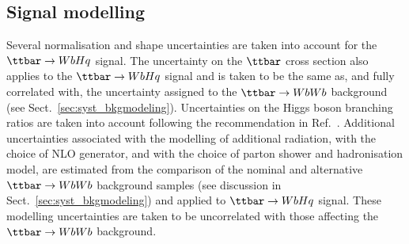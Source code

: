 \subsection{Signal modelling}
\label{sec:syst_sigmodeling}

Several normalisation and shape uncertainties are taken into account for the $\Hq$ signal.
The uncertainty on the $\ttbar$ cross section also applies to the $\Hq$ signal and is taken to be the same as, 
and fully correlated with, the uncertainty assigned to the $\ttbar \to WbWb$ background (see Sect.~\ref{sec:syst_bkgmodeling}).
Uncertainties on the Higgs boson branching ratios are taken into account
following the recommendation in Ref.~\cite{deFlorian:2016spz}.
Additional uncertainties associated with the modelling of additional radiation, with the choice of NLO generator, and
with the choice of parton shower and hadronisation model, are estimated from the comparison of the nominal
and alternative $\ttbar \to WbWb$ background samples (see discussion in Sect.~\ref{sec:syst_bkgmodeling}) and applied to $\Hq$ signal. 
These modelling uncertainties are taken to be uncorrelated with those affecting the $\ttbar \to WbWb$ background.
